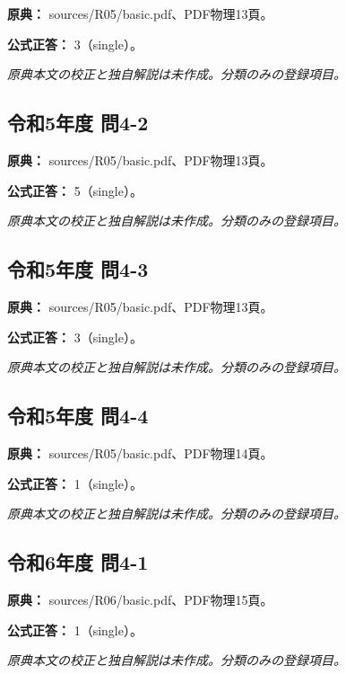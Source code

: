 \noindent\textbf{原典：} sources/R05/basic.pdf、PDF物理13頁。

\textbf{公式正答：} 3（single）。

\par\textit{原典本文の校正と独自解説は未作成。分類のみの登録項目。}

\subsection{令和5年度 問4-2}
\label{q:r05-reg-basic-4-2}

\noindent\textbf{原典：} sources/R05/basic.pdf、PDF物理13頁。

\textbf{公式正答：} 5（single）。

\par\textit{原典本文の校正と独自解説は未作成。分類のみの登録項目。}

\subsection{令和5年度 問4-3}
\label{q:r05-reg-basic-4-3}

\noindent\textbf{原典：} sources/R05/basic.pdf、PDF物理13頁。

\textbf{公式正答：} 3（single）。

\par\textit{原典本文の校正と独自解説は未作成。分類のみの登録項目。}

\subsection{令和5年度 問4-4}
\label{q:r05-reg-basic-4-4}

\noindent\textbf{原典：} sources/R05/basic.pdf、PDF物理14頁。

\textbf{公式正答：} 1（single）。

\par\textit{原典本文の校正と独自解説は未作成。分類のみの登録項目。}

\subsection{令和6年度 問4-1}
\label{q:r06-reg-basic-4-1}

\noindent\textbf{原典：} sources/R06/basic.pdf、PDF物理15頁。

\textbf{公式正答：} 1（single）。

\par\textit{原典本文の校正と独自解説は未作成。分類のみの登録項目。}

